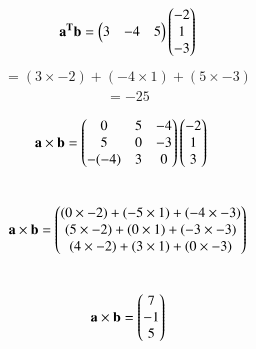 \begin{align}
\mathbf{a^Tb}=\begin{pmatrix}3&-4&5\end{pmatrix} \begin{pmatrix}-2\\1\\-3\end{pmatrix}  
\end{align}
\begin{align}
=(3\times -2)+(-4\times 1)+(5\times -3)
\end{align}
\begin{align}
=-25    
\end{align}

\begin{align}
\mathbf{a \times b} &= \begin{pmatrix}0 & 5 & -4\\ 5 & 0 & -3\\ -(-4) & 3 &  0\end{pmatrix} \begin{pmatrix}-2\\1\\3\end{pmatrix}    
\end{align}
\\
\begin{align}
\mathbf{a \times b}  =  \begin{pmatrix}(0 \times -2)  +  (-5 \times 1)  +  (-4 \times -3)\\(5 \times -2)  +  (0 \times 1)  +  (-3 \times -3)\\(4 \times -2)  +  (3 \times 1)  + (0 \times -3)\end{pmatrix}    
\end{align}
\\
\begin{align}
\mathbf{a \times b}  =  \begin{pmatrix}7\\-1\\5\end{pmatrix}    
\end{align}
